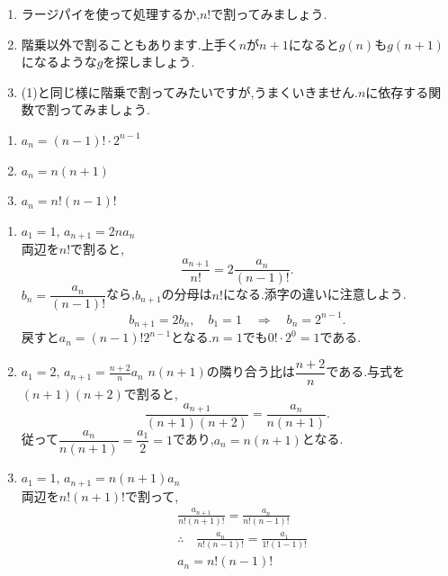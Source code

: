 \noindent{}\par\nobreak
\begin{enumerate}[label=(\arabic*),parsep=3pt,format=\bookitemlink{example-ratio-1}{hint}{problem}]
  \item ラージパイを使って処理するか,$n!$で割ってみましょう.
  \item 階乗以外で割ることもあります.上手く$n$が$n+1$になると$g(n)$も$g(n+1)$になるような$g$を探しましょう.
  \item (1)と同じ様に階乗で割ってみたいですが,うまくいきません.$n$に依存する関数で割ってみましょう.
\end{enumerate}

\noindent{}\par\nobreak
\begin{enumerate}[label=(\arabic*),parsep=3pt,format=\bookitemlink{example-ratio-1}{answer}{problem}]
  \item $\displaystyle a_n=(n-1)!\cdot 2^{n-1}$
  \item $\displaystyle a_n=n(n+1)$
  \item $\displaystyle a_n=n!(n-1)!$
\end{enumerate}

\noindent{}\par\nobreak
\begin{enumerate}[label=(\arabic*),parsep=3pt,format=\bookitemlink{example-ratio-1}{solution}{problem}]
  \item $\displaystyle a_1=1,\, a_{n+1}=2na_n$\\
    両辺を$n!$で割ると,
    \[
      \frac{a_{n+1}}{n!}=2\frac{a_n}{(n-1)!}.
    \]
    $b_n=\dfrac{a_n}{(n-1)!}$なら,$b_{n+1}$の分母は$n!$になる.添字の違いに注意しよう.
    \[
      b_{n+1}=2b_n,\quad b_1=1\quad\Longrightarrow\quad b_n=2^{n-1}.
    \]
    戻すと$a_n=(n-1)!2^{n-1}$となる.$n=1$でも$0!\cdot2^0=1$である.

  \item $\displaystyle a_1=2,\, a_{n+1}=\frac{n+2}{n}a_n$
    $n(n+1)$の隣り合う比は$\dfrac{n+2}{n}$である.与式を$(n+1)(n+2)$で割ると,
    \[
      \frac{a_{n+1}}{(n+1)(n+2)}=\frac{a_n}{n(n+1)}.
    \]
    従って$\dfrac{a_n}{n(n+1)}=\dfrac{a_1}{2}=1$であり,$a_n=n(n+1)$となる.
  \item $\displaystyle a_1=1,\, a_{n+1}=n(n+1)a_n$\\
    両辺を$n!(n+1)!$で割って,
    \begin{align*}
      &\frac{a_{n+1}}{n!(n+1)!}=\frac{a_n}{n!(n-1)!}\\
      &\therefore \quad \frac{a_n}{n!(n-1)!}=\frac{a_1}{1!(1-1)!}\\
      &a_n=n!(n-1)!
    \end{align*}
\end{enumerate}
